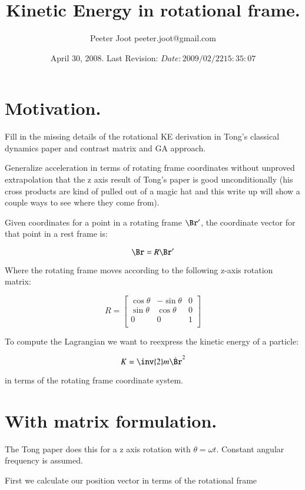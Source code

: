 \documentclass{article}      %
\title{ Kinetic Energy in rotational frame. } %
\author{Peeter Joot \quad peeter.joot@gmail.com}         %
\date{ April 30, 2008.  Last Revision: $Date: 2009/02/22 15:35:07 $ }
\newcommand{\dt}[1]{\dot{#1}}
\begin{document}

\maketitle{}

\section{ Motivation. }

Fill in the missing details of the rotational KE derivation in Tong's classical
dynamics paper and contrast matrix and GA approach.

Generalize acceleration in terms
of rotating frame coordinates without unproved extrapolation that the z axis result
of Tong's paper is good unconditionally (his cross products are kind of pulled out of
a magic hat and this write up will show a couple ways to see where they come from).

Given coordinates for a point in a rotating frame $\Br'$, the coordinate vector for that point
in a rest frame is:

\begin{equation}\label{eqn:rotcoord}
\Br = R \Br'
\end{equation}

Where the rotating frame moves according to the following z-axis rotation matrix:

\[
R = 
\begin{bmatrix}
\cos \theta & -\sin \theta & 0 \\
\sin \theta & \cos \theta & 0 \\
0 & 0 & 1 \\
\end{bmatrix}
\]

To compute the Lagrangian we want to reexpress the 
kinetic energy of a particle:

\[
K = 
\inv{2} m \dt{\Br}^2
\]

in terms of the rotating frame coordinate system.

\section{ With matrix formulation. }

The Tong paper does this for a z axis rotation with $\theta = \omega t$.
Constant angular frequency is assumed.

First we calculate our position vector in terms of the rotational frame
\end{document}
